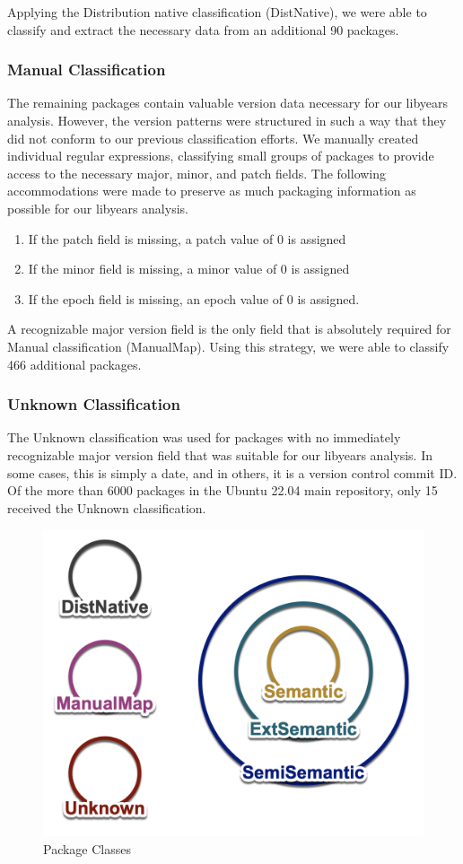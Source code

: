 \documentclass[sn-mathphys-num]{sn-jnl}%
\theoremstyle{thmstyleone}%
\theoremstyle{thmstyletwo}%
\theoremstyle{thmstylethree}%
\begin{document}
Applying the Distribution native classification (DistNative), we were able to classify and extract the necessary data from an additional 90 packages.

\subsubsection{\textbf{Manual Classification}}
The remaining packages contain valuable version data necessary for our libyears analysis. However, the version patterns were structured in such a way that they did not conform to our previous classification efforts. We manually created individual regular expressions, classifying small groups of packages to provide access to the necessary major, minor, and patch fields. The following accommodations were made to preserve as much packaging information as possible for our libyears analysis.

\begin{enumerate}
    \item If the patch field is missing, a patch value of 0 is assigned
    \item If the minor field is missing, a minor value of 0 is assigned
    \item If the epoch field is missing, an epoch value of 0 is assigned.
\end{enumerate}

A recognizable major version field is the only field that is absolutely required for Manual classification (ManualMap). Using this strategy, we were able to classify 466 additional packages.

\subsubsection{\textbf{Unknown Classification}}

The Unknown classification was used for packages with no immediately recognizable major version field that was suitable for our libyears analysis. In some cases, this is simply a date, and in others, it is a version control commit ID. Of the more than 6000 packages in the Ubuntu 22.04 main repository, only 15 received the Unknown classification.

\begin{figure}[h]
    \centering
    \includegraphics[width=0.75\linewidth]{figures/package-classes.png}
    \caption{Package Classes}
    \label{fig:class-relationships}
\end{figure}
\end{document}
